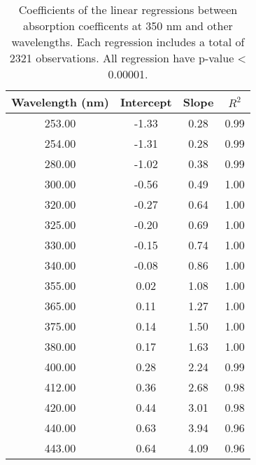 \begin{table}[ht]
\centering
\begin{tabular}{cccc}
  \hline
Wavelength (nm) & Intercept & Slope & $R^2$ \\ 
  \hline
253.00 & -1.33 & 0.28 & 0.99 \\ 
  254.00 & -1.31 & 0.28 & 0.99 \\ 
  280.00 & -1.02 & 0.38 & 0.99 \\ 
  300.00 & -0.56 & 0.49 & 1.00 \\ 
  320.00 & -0.27 & 0.64 & 1.00 \\ 
  325.00 & -0.20 & 0.69 & 1.00 \\ 
  330.00 & -0.15 & 0.74 & 1.00 \\ 
  340.00 & -0.08 & 0.86 & 1.00 \\ 
  355.00 & 0.02 & 1.08 & 1.00 \\ 
  365.00 & 0.11 & 1.27 & 1.00 \\ 
  375.00 & 0.14 & 1.50 & 1.00 \\ 
  380.00 & 0.17 & 1.63 & 1.00 \\ 
  400.00 & 0.28 & 2.24 & 0.99 \\ 
  412.00 & 0.36 & 2.68 & 0.98 \\ 
  420.00 & 0.44 & 3.01 & 0.98 \\ 
  440.00 & 0.63 & 3.94 & 0.96 \\ 
  443.00 & 0.64 & 4.09 & 0.96 \\ 
   \hline
\end{tabular}
\caption{Coefficients of the linear regressions between absorption 
coefficents at 350 nm and other wavelengths. Each regression includes a total 
of 2321 observations. All regression have p-value < 0.00001.} 
\end{table}
